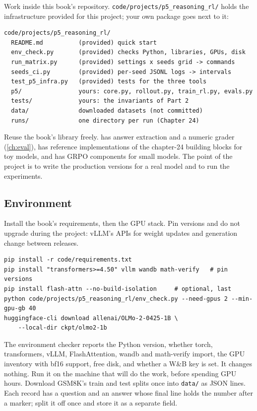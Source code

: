 Work inside this book's repository. \texttt{code/projects/p5\_reasoning\_rl/} holds the infrastructure
provided for this project; your own package goes next to it:
\begin{lstlisting}[style=plain,caption={Project layout. Only the files marked (provided) exist at the start.},label={lst:proj5:layout}]
code/projects/p5_reasoning_rl/
  README.md          (provided) quick start
  env_check.py       (provided) checks Python, libraries, GPUs, disk
  run_matrix.py      (provided) settings x seeds grid -> commands
  seeds_ci.py        (provided) per-seed JSONL logs -> intervals
  test_p5_infra.py   (provided) tests for the three tools
  p5/                yours: core.py, rollout.py, train_rl.py, evals.py
  tests/             yours: the invariants of Part 2
  data/              downloaded datasets (not committed)
  runs/              one directory per run (Chapter 24)
\end{lstlisting}
Reuse the book's library freely.  has answer extraction and a numeric grader
(\cref{ch:eval}),  has reference implementations of the chapter-24 building blocks
for toy models, and  has GRPO components for small models. The point of the project
is to write the production versions for a real model and to run the experiments.

\subsection{Environment}

Install the book's requirements, then the GPU stack. Pin versions and do not upgrade during the
project: vLLM's APIs for weight updates and generation change between releases.

\begin{lstlisting}[style=shell,caption={Environment bring-up.},label={lst:proj5:setup}]
pip install -r code/requirements.txt
pip install "transformers>=4.50" vllm wandb math-verify   # pin versions
pip install flash-attn --no-build-isolation     # optional, last
python code/projects/p5_reasoning_rl/env_check.py --need-gpus 2 --min-gpu-gb 40
huggingface-cli download allenai/OLMo-2-0425-1B \
    --local-dir ckpt/olmo2-1b
\end{lstlisting}
The environment checker reports the Python version, whether torch, transformers, vLLM,
FlashAttention, wandb and math-verify import, the GPU inventory with bf16 support, free disk, and
whether a W\&B key is set. It changes nothing. Run it on the machine that will do the work, before
spending GPU hours. Download GSM8K's train and test splits once into \texttt{data/} as JSON lines.
Each record has a question and an answer whose final line holds the number after a marker; split it
off once and store it as a separate field.


